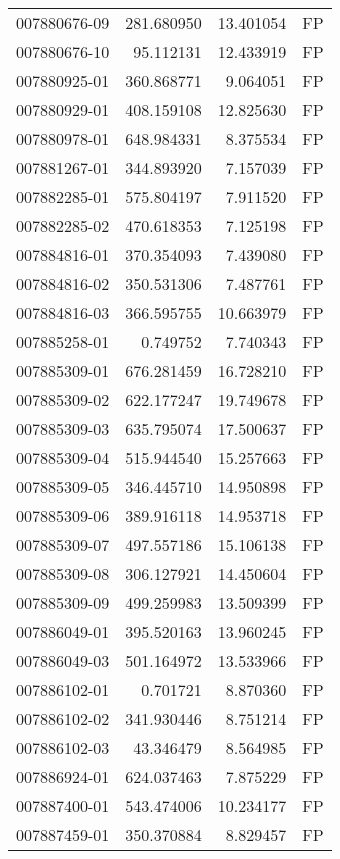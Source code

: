 \begin{tabular}{lrrl}
007880676-09 &  281.680950 &    13.401054 &   FP \\
007880676-10 &   95.112131 &    12.433919 &   FP \\
007880925-01 &  360.868771 &     9.064051 &   FP \\
007880929-01 &  408.159108 &    12.825630 &   FP \\
007880978-01 &  648.984331 &     8.375534 &   FP \\
007881267-01 &  344.893920 &     7.157039 &   FP \\
007882285-01 &  575.804197 &     7.911520 &   FP \\
007882285-02 &  470.618353 &     7.125198 &   FP \\
007884816-01 &  370.354093 &     7.439080 &   FP \\
007884816-02 &  350.531306 &     7.487761 &   FP \\
007884816-03 &  366.595755 &    10.663979 &   FP \\
007885258-01 &    0.749752 &     7.740343 &   FP \\
007885309-01 &  676.281459 &    16.728210 &   FP \\
007885309-02 &  622.177247 &    19.749678 &   FP \\
007885309-03 &  635.795074 &    17.500637 &   FP \\
007885309-04 &  515.944540 &    15.257663 &   FP \\
007885309-05 &  346.445710 &    14.950898 &   FP \\
007885309-06 &  389.916118 &    14.953718 &   FP \\
007885309-07 &  497.557186 &    15.106138 &   FP \\
007885309-08 &  306.127921 &    14.450604 &   FP \\
007885309-09 &  499.259983 &    13.509399 &   FP \\
007886049-01 &  395.520163 &    13.960245 &   FP \\
007886049-03 &  501.164972 &    13.533966 &   FP \\
007886102-01 &    0.701721 &     8.870360 &   FP \\
007886102-02 &  341.930446 &     8.751214 &   FP \\
007886102-03 &   43.346479 &     8.564985 &   FP \\
007886924-01 &  624.037463 &     7.875229 &   FP \\
007887400-01 &  543.474006 &    10.234177 &   FP \\
007887459-01 &  350.370884 &     8.829457 &   FP \\

\end{tabular}

